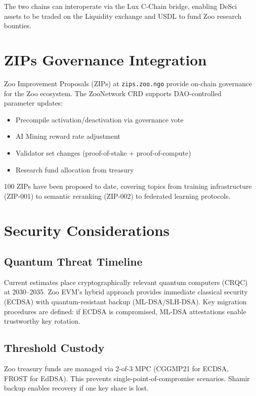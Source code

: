 \documentclass[11pt,a4paper]{article}
\begin{document}
The two chains can interoperate via the Lux C-Chain bridge, enabling DeSci assets to be traded on the Liquidity exchange and USDL to fund Zoo research bounties.

\section{ZIPs Governance Integration}

Zoo Improvement Proposals (ZIPs) at \texttt{zips.zoo.ngo} provide on-chain governance for the Zoo ecosystem. The ZooNetwork CRD supports DAO-controlled parameter updates:

\begin{itemize}[nosep]
  \item Precompile activation/deactivation via governance vote
  \item AI Mining reward rate adjustment
  \item Validator set changes (proof-of-stake + proof-of-compute)
  \item Research fund allocation from treasury
\end{itemize}

100 ZIPs have been proposed to date, covering topics from training infrastructure (ZIP-001) to semantic reranking (ZIP-002) to federated learning protocols.

\section{Security Considerations}

\subsection{Quantum Threat Timeline}

Current estimates place cryptographically relevant quantum computers (CRQC) at 2030--2035. Zoo EVM's hybrid approach provides immediate classical security (ECDSA) with quantum-resistant backup (ML-DSA/SLH-DSA). Key migration procedures are defined: if ECDSA is compromised, ML-DSA attestations enable trustworthy key rotation.

\subsection{Threshold Custody}

Zoo treasury funds are managed via 2-of-3 MPC (CGGMP21 for ECDSA, FROST for EdDSA). This prevents single-point-of-compromise scenarios. Shamir backup enables recovery if one key share is lost.
\end{document}

